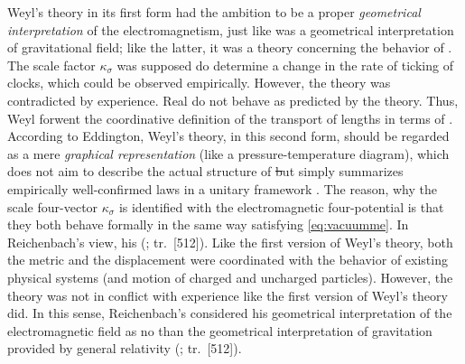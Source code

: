\documentclass[submitted]{article}
\renewcommand{\rzlp}[2]{(\cite[#1]{Reichenbach1928}; tr.\ #2)\xspace}
\renewcommand{\rzlap}[2]{(\cite[#1]{Reichenbach1928}; tr.\ [#2])\xspace}
\begin{document}
Weyl's theory in its first form had the ambition to be a proper \emph{geometrical interpretation} of the electromagnetism, just like \gr was a geometrical interpretation of gravitational field; like the latter, it was a theory concerning the behavior of \rac. The scale factor $\kappa_\sigma$ was supposed do determine a change in the rate of ticking of clocks, which could be observed empirically. However, the theory was contradicted by experience. Real \rac do not behave as predicted by the theory. Thus, Weyl forwent the coordinative definition of the transport of lengths in terms of \rac. According to Eddington, Weyl's theory, in this second form, should be regarded as a mere \emph{graphical representation} (like a pressure-temperature diagram), which does not aim to describe the actual structure of \st but simply summarizes empirically well-confirmed laws in a unitary framework \citep[see][\S8.3]{Ryckman2005}. The reason, why the scale four-vector $\kappa_\sigma$ is identified with the electromagnetic four-potential is that they both behave formally in the same way satisfying \cref{eq:vacuumme}. In Reichenbach's view, his  \rzlap{365}{512}. Like the first version of Weyl's theory, both the metric and the displacement were coordinated with the behavior of existing physical systems (\rac and motion of charged and uncharged particles). However, the theory was not in conflict with experience like the first version of Weyl's theory did. In this sense, Reichenbach's considered his geometrical interpretation of the electromagnetic field as no  than the geometrical interpretation of gravitation provided by general relativity \rzlap{366}{512}.

\end{document}
